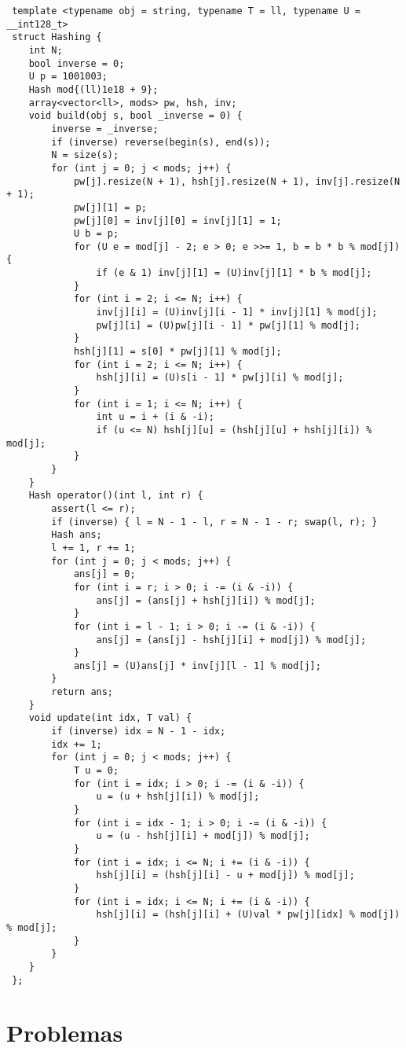 \documentclass[11pt, a4paper, twoside]{article}
\begin{document}
\begin{lstlisting}
 template <typename obj = string, typename T = ll, typename U = __int128_t>
 struct Hashing {
 	int N;
 	bool inverse = 0;
 	U p = 1001003;
 	Hash mod{(ll)1e18 + 9};
 	array<vector<ll>, mods> pw, hsh, inv;
 	void build(obj s, bool _inverse = 0) {
 		inverse = _inverse;
 		if (inverse) reverse(begin(s), end(s));
 		N = size(s);
 		for (int j = 0; j < mods; j++) {
 			pw[j].resize(N + 1), hsh[j].resize(N + 1), inv[j].resize(N + 1);
 			pw[j][1] = p;
 			pw[j][0] = inv[j][0] = inv[j][1] = 1;
 			U b = p;
 			for (U e = mod[j] - 2; e > 0; e >>= 1, b = b * b % mod[j]) {
 				if (e & 1) inv[j][1] = (U)inv[j][1] * b % mod[j];
 			}
 			for (int i = 2; i <= N; i++) {
 				inv[j][i] = (U)inv[j][i - 1] * inv[j][1] % mod[j];
 				pw[j][i] = (U)pw[j][i - 1] * pw[j][1] % mod[j];
 			}
 			hsh[j][1] = s[0] * pw[j][1] % mod[j];
 			for (int i = 2; i <= N; i++) {
 				hsh[j][i] = (U)s[i - 1] * pw[j][i] % mod[j];
 			}
 			for (int i = 1; i <= N; i++) {
 				int u = i + (i & -i);
 				if (u <= N) hsh[j][u] = (hsh[j][u] + hsh[j][i]) % mod[j];
 			}
 		}
 	}
 	Hash operator()(int l, int r) {
 		assert(l <= r);
 		if (inverse) { l = N - 1 - l, r = N - 1 - r; swap(l, r); }
 		Hash ans;
 		l += 1, r += 1;
 		for (int j = 0; j < mods; j++) {
 			ans[j] = 0;
 			for (int i = r; i > 0; i -= (i & -i)) {
 				ans[j] = (ans[j] + hsh[j][i]) % mod[j];
 			}
 			for (int i = l - 1; i > 0; i -= (i & -i)) {
 				ans[j] = (ans[j] - hsh[j][i] + mod[j]) % mod[j];
 			}
 			ans[j] = (U)ans[j] * inv[j][l - 1] % mod[j];
 		}
 		return ans;
 	}
 	void update(int idx, T val) {
 		if (inverse) idx = N - 1 - idx;
 		idx += 1;
 		for (int j = 0; j < mods; j++) {
 			T u = 0;
 			for (int i = idx; i > 0; i -= (i & -i)) {
 				u = (u + hsh[j][i]) % mod[j];
 			}
 			for (int i = idx - 1; i > 0; i -= (i & -i)) {
 				u = (u - hsh[j][i] + mod[j]) % mod[j];
 			}
 			for (int i = idx; i <= N; i += (i & -i)) {
 				hsh[j][i] = (hsh[j][i] - u + mod[j]) % mod[j];
 			}
 			for (int i = idx; i <= N; i += (i & -i)) {
 				hsh[j][i] = (hsh[j][i] + (U)val * pw[j][idx] % mod[j]) % mod[j];
 			}
 		}
 	}
 };
\end{lstlisting}

\clearpage


%
%

\section{Problemas}
\end{document}
